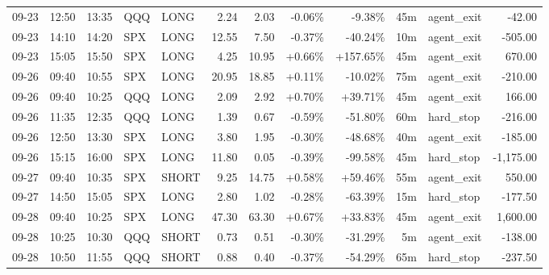 \documentclass[11pt,a4paper,twoside]{article}
\begin{document}
\begin{center}
\begin{longtable}{>{\color{txtmain}}l l l l l r r r r r >{\color{txtmain}}l r}
09-23 & 12:50 & 13:35 & QQQ & LONG & 2.24 & 2.03 & \textcolor{lossred}{-0.06\%} & \textcolor{lossred}{-9.38\%} & 45m & agent\_exit & \textcolor{lossred}{-42.00} \\
09-23 & 14:10 & 14:20 & SPX & LONG & 12.55 & 7.50 & \textcolor{lossred}{-0.37\%} & \textcolor{lossred}{-40.24\%} & 10m & agent\_exit & \textcolor{lossred}{-505.00} \\
09-23 & 15:05 & 15:50 & SPX & LONG & 4.25 & 10.95 & \textcolor{wingreen}{+0.66\%} & \textcolor{wingreen}{+157.65\%} & 45m & agent\_exit & \textcolor{wingreen}{670.00} \\
09-26 & 09:40 & 10:55 & SPX & LONG & 20.95 & 18.85 & \textcolor{wingreen}{+0.11\%} & \textcolor{lossred}{-10.02\%} & 75m & agent\_exit & \textcolor{lossred}{-210.00} \\
09-26 & 09:40 & 10:25 & QQQ & LONG & 2.09 & 2.92 & \textcolor{wingreen}{+0.70\%} & \textcolor{wingreen}{+39.71\%} & 45m & agent\_exit & \textcolor{wingreen}{166.00} \\
09-26 & 11:35 & 12:35 & QQQ & LONG & 1.39 & 0.67 & \textcolor{lossred}{-0.59\%} & \textcolor{lossred}{-51.80\%} & 60m & hard\_stop & \textcolor{lossred}{-216.00} \\
09-26 & 12:50 & 13:30 & SPX & LONG & 3.80 & 1.95 & \textcolor{lossred}{-0.30\%} & \textcolor{lossred}{-48.68\%} & 40m & agent\_exit & \textcolor{lossred}{-185.00} \\
09-26 & 15:15 & 16:00 & SPX & LONG & 11.80 & 0.05 & \textcolor{lossred}{-0.39\%} & \textcolor{lossred}{-99.58\%} & 45m & hard\_stop & \textcolor{lossred}{-1,175.00} \\
09-27 & 09:40 & 10:35 & SPX & SHORT & 9.25 & 14.75 & \textcolor{wingreen}{+0.58\%} & \textcolor{wingreen}{+59.46\%} & 55m & agent\_exit & \textcolor{wingreen}{550.00} \\
09-27 & 14:50 & 15:05 & SPX & LONG & 2.80 & 1.02 & \textcolor{lossred}{-0.28\%} & \textcolor{lossred}{-63.39\%} & 15m & hard\_stop & \textcolor{lossred}{-177.50} \\
09-28 & 09:40 & 10:25 & SPX & LONG & 47.30 & 63.30 & \textcolor{wingreen}{+0.67\%} & \textcolor{wingreen}{+33.83\%} & 45m & agent\_exit & \textcolor{wingreen}{1,600.00} \\
09-28 & 10:25 & 10:30 & QQQ & SHORT & 0.73 & 0.51 & \textcolor{lossred}{-0.30\%} & \textcolor{lossred}{-31.29\%} & 5m & agent\_exit & \textcolor{lossred}{-138.00} \\
09-28 & 10:50 & 11:55 & QQQ & SHORT & 0.88 & 0.40 & \textcolor{lossred}{-0.37\%} & \textcolor{lossred}{-54.29\%} & 65m & hard\_stop & \textcolor{lossred}{-237.50} \\

\end{longtable}
\end{center}
\end{document}
